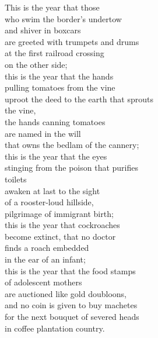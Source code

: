 \documentclass[a4paper,10pt,openany]{memoir}
\begin{document}
\begin{multicols}{2}
\noindent
This is the year that those \\
who swim the border's undertow \\
and shiver in boxcars \\
are greeted with trumpets and drums \\
at the first railroad crossing \\
on the other side; \\
this is the year that the hands \\
pulling tomatoes from the vine \\
uproot the deed to the earth that sprouts \\
\vin the vine, \\
the hands canning tomatoes \\
are named in the will \\
that owns the bedlam of the cannery; \\
this is the year that the eyes \\
stinging from the poison that purifies \\ 
\vin toilets \\
awaken at last to the sight \\
of a rooster-loud hillside, \\
pilgrimage of immigrant birth; \\
this is the year that cockroaches \\
become extinct, that no doctor \\
finds a roach embedded \\
in the ear of an infant; \\
this is the year that the food stamps \\
of adolescent mothers \\
are auctioned like gold doubloons, \\
and no coin is given to buy machetes \\
for the next bouquet of severed heads \\
in coffee plantation country. \\
 

\end{multicols}
\end{document}
